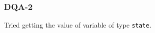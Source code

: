 \subsubsection{DQA-2}\label{sec:error_code_dqa_2}

Tried getting the value of variable of type \texttt{state}.


